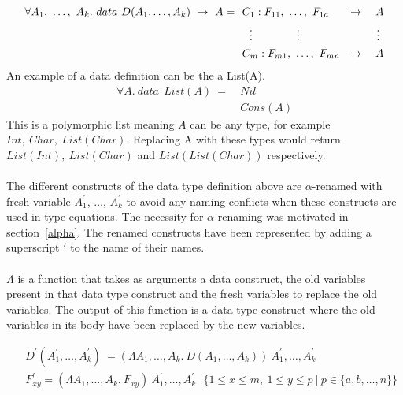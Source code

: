 \documentclass[11pt]{article}
\begin{document}
\begin{align*} 
\forall A_1,~ \ldots,~A_k.~data~ D(A_1,\ldots,A_k)  ~\to~ A =
 & ~~ C_1 : F_{11},~ \ldots, ~ F_{1a} ~~~~~\to ~~~ A \\
 & ~~~~ \vdots \hskip 4em \vdots \hskip 7em \vdots \\ 
 & ~~ C_m : F_{m1},~ \ldots, ~ F_{mn} ~~\to ~~~ A
\end{align*}
An example of a data definition can be the a List(A).
\begin{align*}
    \forall A.~data ~~ List(A)~ =~ & Nil \\ 
                               ~& Cons (A)
\end{align*}
This is a polymorphic list meaning $A$ can be any type, for example $Int,~Char,~List(Char)$. Replacing A with these types would return $List(Int),~List(Char)$ and $List(List(Char))$ respectively. 
~~\\~~\\ 
The different constructs of the data type definition above are $\alpha$-renamed with fresh variable $A_1^{\prime}$, $\ldots$, $A_k^{\prime}$ to avoid any naming conflicts when these constructs are used in type equations. The necessity for $\alpha$-renaming was motivated in section~\ref{alpha}. The renamed constructs have been represented by adding a superscript $\prime$ to the name of their names.
~~\\ ~~\\ 
$\Lambda$ is a function that takes as arguments a data construct, the old variables present in that data type construct and the fresh variables to replace the old variables. The output of this function is a data type construct where the old variables in its body have been replaced by the new variables.   

\begin{align*}
 & ~~ D^\prime(A_1^{\prime},\ldots,A_k^{\prime}) ~ = (\Lambda A_1,\ldots,A_k.~ D(A_1,\ldots,A_k))~A_1^{\prime},\ldots,A_k^{\prime}\\ 
 & ~~ F_{xy}^\prime = (\Lambda A_1,\ldots,A_k.~F_{xy})~A_1^{\prime},\ldots,A_k^{\prime} 
 ~~~  \{1 \leq x \leq m,~1 \leq y \leq p ~|~ p \in \{a,b,\ldots,n\} \} 
 \end{align*}

\end{document}
